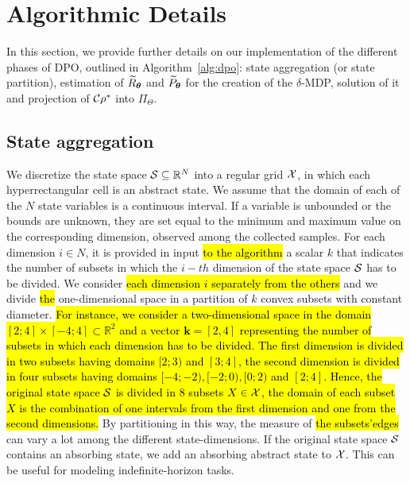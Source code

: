 \section{Algorithmic Details}\label{sec:detail}
In this section, we provide further details on our implementation of the different phases of \ac{DPO}, outlined in Algorithm~\ref{alg:dpo}: state aggregation (or state partition), estimation of $\widetilde{R}_{\boldsymbol{\theta}}$ and $\widetilde{P}_{\boldsymbol{\theta}}$ for the creation of the $\delta$-\ac{MDP}, solution of it and projection of $\mathcal{C}\rho^{*}$ into $\Pi_{\Theta}$.

\subsection{State aggregation}
We discretize the state space $\mathcal{S}\subseteq\mathbb{R}^N$ into a regular grid $\mathcal{X}$, in which each hyperrectangular cell is an abstract state. 
We assume that the domain of each of the $N$ state variables is a continuous interval. If a variable is unbounded or the bounds are unknown, they are set equal to the minimum and maximum value on the corresponding dimension, observed among the collected samples. 
For each dimension $i \in N$, it is provided in input \hl{to the algorithm} a scalar $k$ that indicates the number of subsets in which the $i-th$ dimension of the state space $\mathcal{S}$ has to be divided. We consider \hl{each dimension $i$ separately from the others} and we divide \hl{the} one-dimensional space in a partition of $k$ convex subsets with constant diameter. \hl{For instance, we consider a two-dimensional space in the domain $[2; 4] \times [-4;4] \subset \mathbb{R}^{2}$ and a vector $\boldsymbol{k} = [2,4]$ representing the number of subsets in which each dimension has to be divided. The first dimension is divided in two subsets having domains $[2;3)$ and $[3;4]$, the second dimension is divided in four subsets having domains $[-4;-2),[-2;0),[0;2)$ and $[2;4]$. Hence, the original state space $\mathcal{S}$ is divided in $8$ subsets $X \in \mathcal{X}$, the domain of each subset $X$ is the combination of one intervals from the first dimension and one from the second dimensions.} By partitioning in this way, the measure of \hl{the subsets'edges} can vary a lot among the different state-dimensions.
If the original state space $\mathcal{S}$ contains an absorbing state, we add an absorbing abstract state to $\mathcal{X}$. This can be useful for modeling indefinite-horizon tasks.\\
